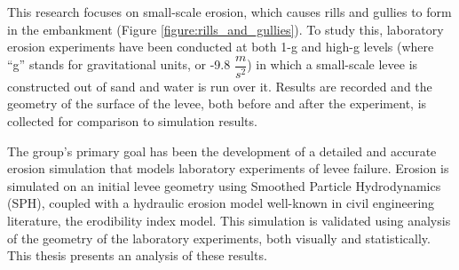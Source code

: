 This research focuses on small-scale erosion, which causes rills and gullies to form in the embankment (Figure \ref{figure:rills_and_gullies}). 
To study this, laboratory erosion experiments have been conducted at both 1-g and high-g levels (where ``g'' stands for gravitational units, or -9.8 $\dfrac{m}{s^2}$) in which a small-scale levee is constructed out of 
sand and water is run over it.
Results are recorded and the geometry of the surface of the levee, both before and after the experiment, is collected for comparison to simulation results. 

The group's primary goal has been the development of a detailed and accurate erosion simulation that models laboratory experiments of levee failure. 
Erosion is simulated on an initial levee geometry using Smoothed Particle Hydrodynamics (SPH), coupled with a hydraulic erosion model well-known in civil engineering literature, the erodibility index model. This simulation is validated using analysis of the geometry of the laboratory experiments, both visually and statistically. This thesis presents an analysis of these results.


